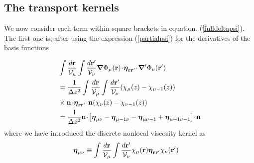 \documentclass[b5paper,openright,10pt]{book}
\newcommand{\esc}{\!\cdot\!}
\begin{document}
\subsection{The transport kernels}
We   now  consider   each  term   within  square   brackets  in 
equation. (\ref{fulldeltapsi}). The first one is, after using the expression
(\ref{partialpsi}) for the derivatives of the basis functions

\begin{align}
&\int \frac{d{\bf r}}{{\cal V}_\mu}
\int \frac{d{\bf r}'}{{\cal V}_\nu}
\boldsymbol{\nabla}\Phi_\mu({\bf r})
\esc\boldsymbol{\eta}_{{\bf r}{\bf r}'}\esc
{\boldsymbol{\nabla}^\prime}\Phi_\nu({\bf r}')
\nonumber\\
&=
\frac{1}{\Delta z^2}\int \frac{d{\bf r}}{{\cal V}_\mu}
\int \frac{d{\bf r}'}{{\cal V}_\nu}
(\chi_\mu(z)-\chi_{\mu-1}(z))
\nonumber\\
&\times{\bf n}\esc\boldsymbol{\eta}_{{\bf r}{\bf r}'}\esc{\bf n}(\chi_\nu(z)-\chi_{\nu-1}(z))
\nonumber\\
&=
\frac{1}{\Delta z^2} {\bf n}\esc\left[\boldsymbol{\eta}_{\mu\nu}-\boldsymbol{\eta}_{\mu-1\nu}-\boldsymbol{\eta}_{\mu\nu-1}+\boldsymbol{\eta}_{\mu-1\nu-1}\right]\esc{\bf n}
\label{TC1}
\end{align}
where we have introduced the discrete nonlocal viscosity kernel as
\begin{align}
\boldsymbol{\eta}_{\mu\nu}&\equiv  \int \frac{d{\bf r}}{{\cal V}_\mu}
\int \frac{d{\bf r}'}{{\cal V}_\nu}
\chi_\mu({\bf r})
\boldsymbol{\eta}_{{\bf r}{\bf r}'}\chi_\nu({\bf r}')
\label{s2disc}
\end{align}
\end{document}

